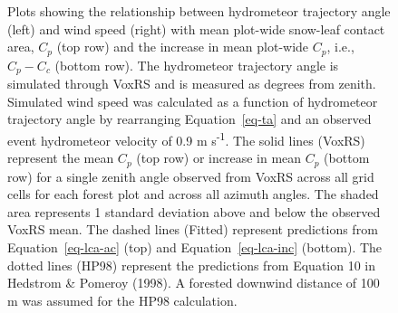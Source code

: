 \documentclass[
  letterpaper,
  DIV=11,
  numbers=noendperiod]{scrartcl}
\begin{document}
\begin{figure}


\caption{\label{fig-lca-ht-ws}Plots showing the relationship between
hydrometeor trajectory angle (left) and wind speed (right) with mean
plot-wide snow-leaf contact area, \(C_p\) (top row) and the increase in
mean plot-wide \(C_p\), i.e., \(C_p - C_c\) (bottom row). The
hydrometeor trajectory angle is simulated through VoxRS and is measured
as degrees from zenith. Simulated wind speed was calculated as a
function of hydrometeor trajectory angle by rearranging
Equation~\ref{eq-ta} and an observed event hydrometeor velocity of 0.9 m
s\textsuperscript{-1}. The solid lines (VoxRS) represent the mean
\(C_p\) (top row) or increase in mean \(C_p\) (bottom row) for a single
zenith angle observed from VoxRS across all grid cells for each forest
plot and across all azimuth angles. The shaded area represents 1
standard deviation above and below the observed VoxRS mean. The dashed
lines (Fitted) represent predictions from Equation~\ref{eq-lca-ac} (top)
and Equation~\ref{eq-lca-inc} (bottom). The dotted lines (HP98)
represent the predictions from Equation 10 in Hedstrom \& Pomeroy
(1998). A forested downwind distance of 100 m was assumed for the HP98
calculation.}

\end{figure}%
\end{document}
